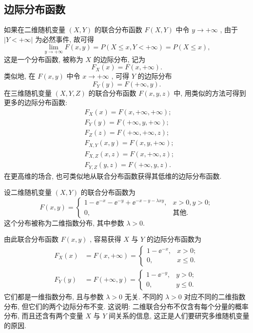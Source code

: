   \subsection{边际分布函数}\label{ssec:3.2.1}
  如果在二维随机变量 $(X,Y)$ 的联合分布函数 $F(X,Y)$ 中令 $y\to+\infty$ , 由于 $|Y<+\infty|$ 为必然事件, 故可得
  \begin{equation*}
  \lim_{y\to+\infty}F(x,y)=P(X\leqslant x,Y<+\infty)=P(X\leqslant x),
  \end{equation*}
  这是一个分布函数, 被称为 $X$ 的边际分布, 记为
  \begin{equation}
  F_{X}(x)=F(x,+\infty).\label{eq:3.2.1}
  \end{equation}
  类似地, 在 $F(x,y)$ 中令 $x\to+\infty$ , 可得 $Y$ 的边际分布
  \begin{equation}
  F_{Y}(y)=F(+\infty,y).\label{eq:3.2.2}
  \end{equation}
  在三维随机变量 $(X,Y,Z)$ 的联合分布函数 $F(x,y,z)$ 中, 用类似的方法可得到更多的边际分布函数:
  \begin{align*}
  &F_{X}(x) = F(x,+\infty,+\infty);\\
  &F_{Y}(y) = F(+\infty,y,+\infty);\\
  &F_{Z}(z) = F(+\infty,+\infty,z);\\
  &F_{X,Y}(x,y) = F(x,y,+\infty);\\
  &F_{X,Z}(x,z) = F(x,+\infty,z);\\
  &F_{Y,Z}(y,z) = F(+\infty,y,z).
  \end{align*}
  在更高维的场合, 也可类似地从联合分布函数获得其低维的边际分布函数.
  \begin{example}\label{exam:3.2.1}
  	设二维随机变量 $(X,Y)$ 的联合分布函数为
  	\begin{equation*}
  	F(x,y)=
  	\begin{cases}
  	1-\ee^{-x}-\ee^{-y}+\ee^{-x-y-\lambda xy}, & x>0,y>0;\\
  	0, & \text{其他}.
  	\end{cases}
  	\end{equation*}
  	这个分布被称为二维指数分布, 其中参数 $\lambda>0$.
  	
  	由此联合分布函数 $F(x,y)$ , 容易获得 $X$ 与 $Y$ 的边际分布函数为
  	\begin{align*}
  	F_{X}(x) &= F(x,+\infty)=
  	\begin{cases}
  	1-\ee^{-x}, & x>0;\\
  	0, & x\leqslant0.
  	\end{cases}\\
  	F_{Y}(y) &= F(+\infty,y)=
  	\begin{cases}
  	1-\ee^{-y}, & y>0;\\
  	0, & y\leqslant0.
  	\end{cases}
  	\end{align*}
  	它们都是一维指数分布, 且与参数 $\lambda>0$ 无关. 不同的 $\lambda>0$ 对应不同的二维指数分布, 但它们的两个边际分布不变. 这说明: 二维联合分布不仅含有每个分量的概率分布, 而且还含有两个变量 $X$ 与 $Y$ 间关系的信息, 这正是人们要研究多维随机变量的原因.
  \end{example}
  
